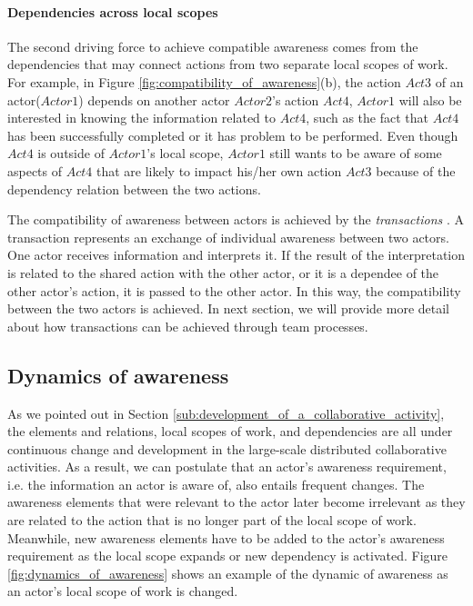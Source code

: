 \paragraph*{Dependencies across local scopes} %
 \label{par:dependencies_across_local_scopes}
 The second driving force to achieve compatible awareness comes from the dependencies that may connect actions from two separate local scopes of work. For example, in Figure \ref{fig:compatibility_of_awareness}(b), the action $Act3$ of an actor($Actor1$) depends on another actor $Actor2$'s action $Act4$, $Actor1$ will also be interested in knowing the information related to $Act4$, such as the fact that $Act4$ has been successfully completed or it has problem to be performed. Even though $Act4$ is outside of $Actor1$'s local scope, $Actor1$ still wants to be aware of some aspects of $Act4$ that are likely to impact his/her own action $Act3$ because of the dependency relation between the two actions.

The compatibility of awareness between actors is achieved by the \emph{transactions} \cite{Salmon2010}. A transaction represents an exchange of individual awareness between two actors. One actor receives information and interprets it. If the result of the interpretation is related to the shared action with the other actor, or it is a dependee of the other actor's action, it is passed to the other actor. In this way, the compatibility between the two actors is achieved. In next section, we will provide more detail about how transactions can be achieved through team processes. 

\subsection{Dynamics of awareness} %
\label{sub:dynamics_of_awareness}
As we pointed out in Section \ref{sub:development_of_a_collaborative_activity}, the elements and relations, local scopes of work, and dependencies are all under continuous change and development in the large-scale distributed collaborative activities. As a result, we can postulate that an actor's awareness requirement, i.e. the information an actor is aware of, also entails frequent changes. The awareness elements that were relevant to the actor later become irrelevant as they are related to the action that is no longer part of the local scope of work. Meanwhile, new awareness elements have to be added to the actor's awareness requirement as the local scope expands or new dependency is activated. Figure \ref{fig:dynamics_of_awareness} shows an example of the dynamic of awareness as an actor's local scope of work is changed.

